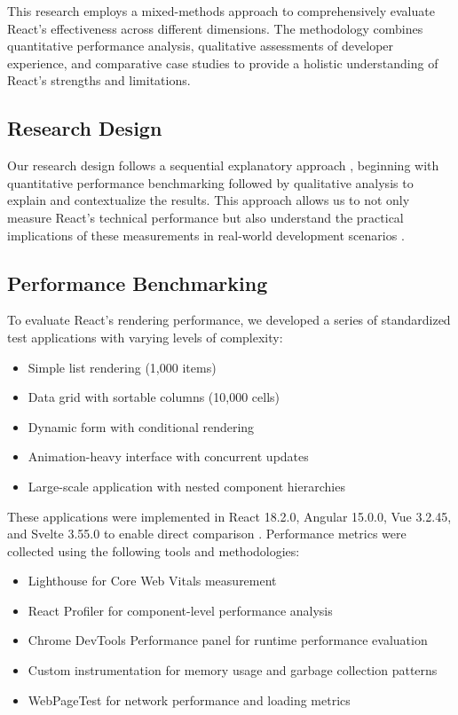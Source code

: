 This research employs a mixed-methods approach to comprehensively evaluate React's effectiveness across different dimensions. The methodology combines quantitative performance analysis, qualitative assessments of developer experience, and comparative case studies to provide a holistic understanding of React's strengths and limitations.

\subsection{Research Design}
Our research design follows a sequential explanatory approach \cite{creswell2017}, beginning with quantitative performance benchmarking followed by qualitative analysis to explain and contextualize the results. This approach allows us to not only measure React's technical performance but also understand the practical implications of these measurements in real-world development scenarios \cite{johnson2021}.

\subsection{Performance Benchmarking}
To evaluate React's rendering performance, we developed a series of standardized test applications with varying levels of complexity:

\begin{itemize}
    \item Simple list rendering (1,000 items)
    \item Data grid with sortable columns (10,000 cells)
    \item Dynamic form with conditional rendering
    \item Animation-heavy interface with concurrent updates
    \item Large-scale application with nested component hierarchies
\end{itemize}

These applications were implemented in React 18.2.0, Angular 15.0.0, Vue 3.2.45, and Svelte 3.55.0 to enable direct comparison \cite{pereira2020}. Performance metrics were collected using the following tools and methodologies:

\begin{itemize}
    \item Lighthouse \cite{lighthouse2022} for Core Web Vitals measurement
    \item React Profiler \cite{reactprofiler2020} for component-level performance analysis
    \item Chrome DevTools Performance panel for runtime performance evaluation
    \item Custom instrumentation for memory usage and garbage collection patterns
    \item WebPageTest \cite{webpagetest2021} for network performance and loading metrics
\end{itemize}

